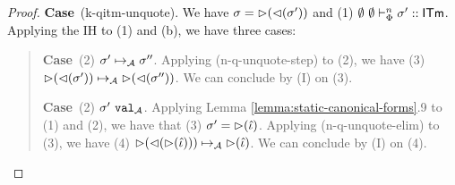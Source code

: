 \documentclass[12pt]{article}
\newcommand{\pfcase}[1]{\textbf{Case}~#1. }
\begin{document}
\begin{proof}







\pfcase{(k-qitm-unquote)} We have $\sigma={\rhd}({\lhd}(\sigma'))$ and (1) $\emptyset~\emptyset \vdash_{\Phi}^{n} \sigma' :: {\sf ITm}$. Applying the IH to (1) and (b), we have three cases:

\begin{quote}
    \pfcase{(2) $\sigma' \mapsto_{\mathcal{A}} \sigma''$} Applying (n-q-unquote-step) to (2), we have (3) ${\rhd}({\lhd}(\sigma')) \mapsto_{\mathcal{A}} {\rhd}({\lhd}(\sigma''))$. We can conclude by (I) on (3).

    \pfcase{(2) $\sigma'~\mathtt{val}_{\mathcal{A}}$} Applying Lemma \ref{lemma:static-canonical-forms}.9 to (1) and (2), we have that (3) $\sigma'={\rhd}(\hat{\iota})$. Applying (n-q-unquote-elim) to (3), we have (4) ${\rhd}({\lhd}({\rhd}(\hat{\iota}))) \mapsto_{\mathcal{A}} {\rhd}(\hat{\iota})$. We can conclude by (I) on (4).


\end{quote}
\end{proof}
\end{document}
